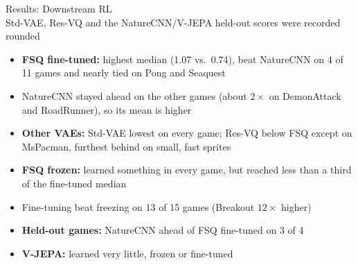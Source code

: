 \documentclass[aspectratio=43,10pt]{beamer}
\begin{document}
\begin{frame}{Results: Downstream RL}
  \centering
  {\footnotesize\setlength{\tabcolsep}{2.5pt}
  }\\[0.2em]
  {\tiny Std-VAE, Res-VQ and the NatureCNN/V-JEPA held-out scores were recorded rounded}
  \vspace{0.2em}
  \begin{itemize}\small\setlength\itemsep{0.12em}
    \item \textbf{FSQ fine-tuned:} highest median (1.07 vs.\ 0.74), beat NatureCNN on 4 of 11
          games and nearly tied on Pong and Seaquest
    \item NatureCNN stayed ahead on the other games (about $2\times$ on DemonAttack and
          RoadRunner), so its mean is higher
    \item \textbf{Other VAEs:} Std-VAE lowest on every game; Res-VQ below FSQ except on MsPacman,
          furthest behind on small, fast sprites
    \item \textbf{FSQ frozen:} learned something in every game, but reached less than a third
          of the fine-tuned median
    \item Fine-tuning beat freezing on 13 of 15 games (Breakout $12\times$ higher)
    \item \textbf{Held-out games:} NatureCNN ahead of FSQ fine-tuned on 3 of 4
    \item \textbf{V-JEPA:} learned very little, frozen or fine-tuned
  \end{itemize}
\end{frame}
\end{document}
